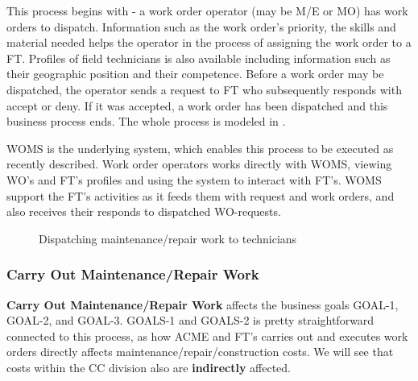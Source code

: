 This process begins with - a work order operator (may be M/E or MO) has work orders to dispatch. Information such as the work order's priority, the skills and material needed helps the operator in the process of assigning the work order to a FT. Profiles of field technicians is also available including information such as their geographic position and their competence. Before a work order may be dispatched, the operator sends a request to FT who subsequently responds with accept or deny. If it was accepted, a work order has been dispatched and this business process ends. The whole process is modeled in .

WOMS is the underlying system, which enables this process to be executed as recently described. Work order operators works directly with WOMS, viewing WO's and FT's profiles and using the system to interact with FT's. WOMS support the FT's activities as it feeds them with request and work orders, and also receives their responds to dispatched WO-requests.
\begin{figure}[H]
	\centering
	\setlength\fboxsep{7pt}
	\setlength\fboxrule{0.5pt}
	\caption{Dispatching maintenance/repair work to technicians}
	\label{fig:dispatch}
\end{figure}
%
\subsubsection{Carry Out Maintenance/Repair Work}
\label{sec:bp4}
\textbf{Carry Out Maintenance/Repair Work} affects the business goals GOAL-1, GOAL-2, and GOAL-3. GOALS-1 and GOALS-2 is pretty straightforward connected to this process, as how ACME and FT's carries out and executes work orders directly affects maintenance/repair/construction costs. We will see that costs within the CC division also are \textbf{indirectly} affected.

